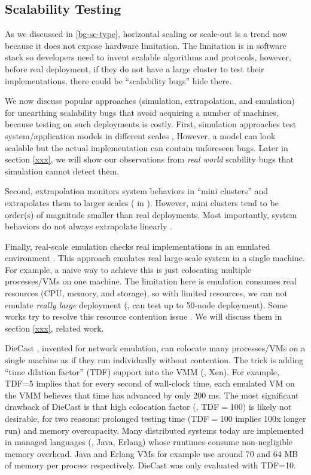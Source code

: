 \subsection{Scalability Testing}

As we discussed in \ref{bg-sc-type}, horizontal scaling or scale-out is a trend
now because it does not expose hardware limitation. The limitation is in
software stack so developers need to invent scalable algorithms and protocols,
however, before real deployment, if they do not have a large cluster to test
their implementations, there could be ``scalability bugs'' hide there.

We now discuss popular approaches (simulation, extrapolation, and emulation) for
unearthing scalability bugs that avoid acquiring a number of machines, because
testing on such deployments is costly.
First, simulation approaches test system/application models in different scales
\cite{Calotoiu+13-ApmScaleBug, Laguna+15-DebugAtScale}, However, a model can
look scalable but the actual implementation can contain unforeseen bugs. Later
in section \ref{xxx}, we will show our observations from \textit{real world}
scability bugs that simulation cannot detect them.

Second, extrapolation monitors system behaviors in ``mini clusters'' and
extrapolates them to larger scales ( in \cite{Wang+14-Exalt}). However,
mini clusters tend to be order(s) of magnitude smaller than real deployments.
Most importantly, system behaviors do not always extrapolate linearly
\cite{Wang+14-Exalt}. 

Finally, real-scale emulation checks real implementations in an emulated
environment \cite{Gupta+08-DieCast, Wang+14-Exalt}. This approach emulates real
large-scale system in a single machine. For example, a naive way to achieve this
is just colocating multiple processes/VMs on one machine. The limitation here is
emulation consumes real resources (CPU, memory, and storage), so with limited
resources, we can not emulate \textit{really large} deployment (\eg, can test up
to 50-node deployment). Some works try to resolve this resource contention issue
\cite{Gupta+08-DieCast, Wang+14-Exalt}. We will discuss them in section
\ref{xxx}, related work.

DieCast \cite{Gupta+08-DieCast}, invented for network emulation, can colocate
many processes/VMs on a single machine as if they run individually without
contention.  The trick is adding ``time dilation factor'' (TDF) support
\cite{Gupta+06-TimeDilation} into the VMM (\eg, Xen).  For example, TDF=5
implies that for every second of wall-clock time, each emulated VM on the VMM
believes that time has advanced by only 200 ms.  The most significant drawback
of DieCast is that high colocation factor (\eg, TDF$=$100) is likely not
desirable, for two reasons: prolonged testing time (TDF$=$100 implies 100x
longer run) and memory overcapacity.  Many distributed systems today are
implemented in managed languages (\eg, Java, Erlang) whose runtimes consume
non-negligible memory overhead. Java and Erlang VMs for example use around 70
and 64 MB of memory per process respectively.  DieCast was only evaluated with
TDF=10.

